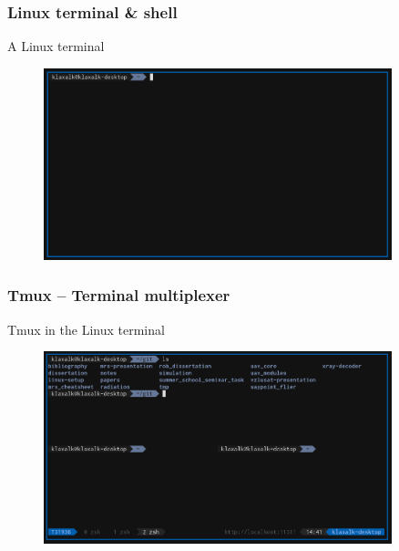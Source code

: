 \documentclass[aspectratio=1610]{beamer}
\begin{document}
\begin{frame}
  \frametitle{Linux terminal \& shell}

  \begin{block}{A Linux terminal}
    \begin{figure}
      \includegraphics[width=0.9\textwidth]{./fig/terminal.png}
    \end{figure}
  \end{block}

\end{frame}



\begin{frame}

  \frametitle{Tmux -- Terminal multiplexer}

  \begin{block}{Tmux in the Linux terminal}
    \begin{figure}
      \includegraphics[width=0.9\textwidth]{./fig/tmux.png}
    \end{figure}
  \end{block}

\end{frame}
\end{document}
